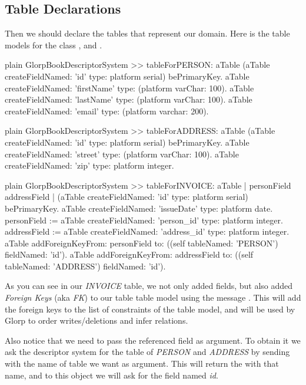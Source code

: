\documentclass[10pt,twoside,english]{_support/latex/sbabook/sbabook}
\begin{document}
\subsection{Table Declarations}
Then we should declare the tables that represent our domain.
Here is the table models for the class ,  and .

\begin{displaycode}{plain}
GlorpBookDescriptorSystem >> tableForPERSON: aTable
	(aTable createFieldNamed: 'id' type: platform serial) bePrimaryKey.
	aTable createFieldNamed: 'firstName' type: (platform varChar: 100).
	aTable createFieldNamed: 'lastName' type: (platform varChar: 100).
	aTable createFieldNamed: 'email' type: (platform varchar: 200).
\end{displaycode}

\begin{displaycode}{plain}
GlorpBookDescriptorSystem >> tableForADDRESS: aTable
	(aTable createFieldNamed: 'id' type: platform serial) bePrimaryKey.
	aTable createFieldNamed: 'street' type: (platform varChar: 100).
	aTable createFieldNamed: 'zip' type: platform integer.
\end{displaycode}

\begin{displaycode}{plain}
GlorpBookDescriptorSystem >> tableForINVOICE: aTable
	| personField addressField |
	(aTable createFieldNamed: 'id' type: platform serial)
		bePrimaryKey.
	aTable createFieldNamed: 'issueDate' type: platform date.
	personField := aTable
		createFieldNamed: 'person_id'
		type: platform integer.
	addressField := aTable
	 	createFieldNamed: 'address_id'
		type: platform integer.
	aTable
		addForeignKeyFrom: personField
		to: ((self tableNamed: 'PERSON') fieldNamed: 'id').
	aTable
		addForeignKeyFrom: addressField
		to: ((self tableNamed: 'ADDRESS') fieldNamed: 'id').
\end{displaycode}

As you can see in our \textit{INVOICE} table, we not only added fields, but also
added \textit{Foreign Keys} (aka \textit{FK})
to our table table model using the message .
This will add the foreign keys to the list of constraints of the table model, and will be used by Glorp to order writes/deletions and
infer relations.

Also notice that we need to pass the referenced field as argument.
To obtain it we ask the descriptor system for the table of \textit{PERSON}
and \textit{ADDRESS} by sending  with the name of table we want
as argument. This will return the  with that name,
and to this object we will ask for the field named \textit{id}.
\end{document}

